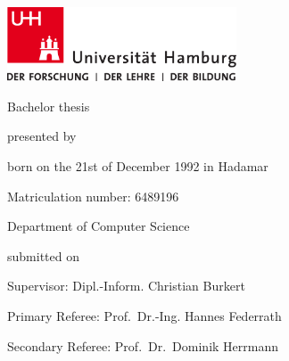 \begin{titlepage}
    \includegraphics[width=6.8cm]{./pic/up-uhh-logo-u-2010-u-farbe-u-rgb.pdf}
    \begin{center}\Large
        \vfill
        Bachelor thesis
        \vfill

        \makeatletter
        {\Large\textsf{\textbf{\@title}}\par}
        \makeatother

        \vfill
        presented by
        \par\bigskip

        \makeatletter
        {\@author} \par
        \makeatother

        born on the 21st of December 1992 in Hadamar \par
        Matriculation number: 6489196 \par
        Department of Computer Science
        \vfill

        \makeatletter
        submitted on {\@date}
        \makeatother

        \vfill
        Supervisor: Dipl.-Inform. Christian Burkert \par
        Primary Referee: Prof.\ Dr.-Ing. Hannes Federrath \par
        Secondary Referee: Prof.\ Dr.\ Dominik Herrmann

    \end{center}
\end{titlepage}
